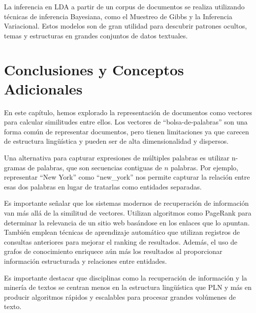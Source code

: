 La inferencia en LDA a partir de un corpus de documentos se realiza utilizando técnicas de inferencia Bayesiana, como el Muestreo de Gibbs y la Inferencia Variacional. Estos modelos son de gran utilidad para descubrir patrones ocultos, temas y estructuras en grandes conjuntos de datos textuales.

\section{Conclusiones y Conceptos Adicionales}

En este capítulo, hemos explorado la representación de documentos como vectores para calcular similitudes entre ellos. Los vectores de ``bolsa-de-palabras'' son una forma común de representar documentos, pero tienen limitaciones ya que carecen de estructura lingüística y pueden ser de alta dimensionalidad y dispersos.

Una alternativa para capturar expresiones de múltiples palabras es utilizar n-gramas de palabras, que son secuencias contiguas de $n$ palabras. Por ejemplo, representar ``New York'' como ``new\_york'' nos permite capturar la relación entre esas dos palabras en lugar de tratarlas como entidades separadas.

Es importante señalar que los sistemas modernos de recuperación de información van más allá de la similitud de vectores. Utilizan algoritmos como PageRank \cite{page1998pagerank} para determinar la relevancia de un sitio web basándose en los enlaces que lo apuntan. También emplean técnicas de aprendizaje automático que utilizan registros de consultas anteriores para mejorar el ranking de resultados. Además, el uso de grafos de conocimiento enriquece aún más los resultados al proporcionar información estructurada y relaciones entre entidades.

Es importante destacar que disciplinas como la recuperación de información y la minería de textos se centran menos en la estructura lingüística que PLN y más en producir algoritmos rápidos y escalables para procesar grandes volúmenes de texto.
